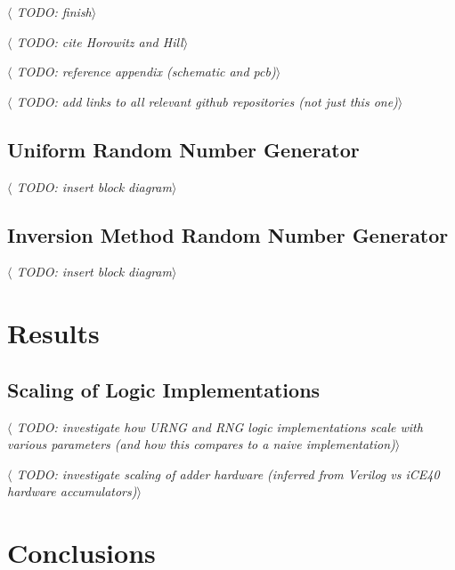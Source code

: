 \documentclass[12pt]{article}
\begin{document}
    \textit{$\langle$ TODO: finish$\rangle$}

    \textit{$\langle$ TODO: cite Horowitz and Hill$\rangle$}

    \textit{$\langle$ TODO: reference appendix (schematic and pcb)$\rangle$}

    \textit{$\langle$ TODO: add links to all relevant github repositories (not just this one)$\rangle$}


  \subsection{Uniform Random Number Generator}
  \textit{$\langle$ TODO: insert block diagram$\rangle$}

  \subsection{Inversion Method Random Number Generator}
    \textit{$\langle$ TODO: insert block diagram$\rangle$}



%
%

\section{Results}

  \subsection{Scaling of Logic Implementations}
    \textit{$\langle$ TODO: investigate how URNG and RNG logic implementations scale with various parameters (and how this compares to a naive implementation)$\rangle$}

  \textit{$\langle$ TODO: investigate scaling of adder hardware (inferred from Verilog vs iCE40 hardware accumulators)$\rangle$}

\newpage



%
%

\section{Conclusions}

\newpage



\noindent

\markboth{}{}
\printbibliography
\markboth{}{}
\end{document}
